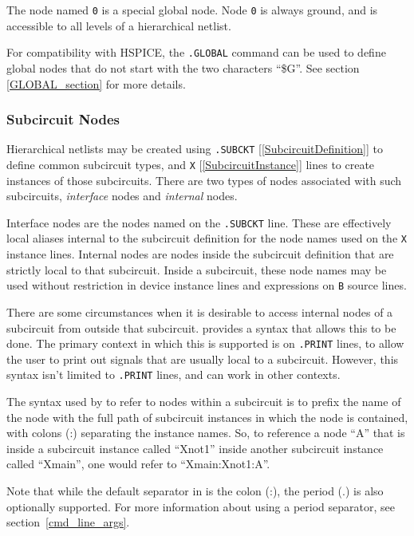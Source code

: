 The node named \texttt{0} is a special global node.  Node \texttt{0}
is always ground, and is accessible to all levels of a hierarchical
netlist.

For compatibility with HSPICE, the \texttt{.GLOBAL} command can
be used to define global nodes that do not start with the two
characters ``\$G''.  See section \ref{GLOBAL_section} for more details.

\subsubsection{Subcircuit Nodes}
\label{subckt_nodes}

Hierarchical netlists may be created using
\texttt{.SUBCKT} [\ref{SubcircuitDefinition}] to define common subcircuit
types, and \texttt{X} [\ref{SubcircuitInstance}] lines to create
instances of those subcircuits.  There are two types of nodes
associated with such subcircuits, {\em interface\/} nodes and {\em
internal\/} nodes.

Interface nodes are the nodes named on the \texttt{.SUBCKT} line.
These are effectively local aliases internal to the subcircuit
definition for the node names used on the \texttt{X} instance lines.
Internal nodes are nodes inside the subcircuit definition that are
strictly local to that subcircuit.  Inside a subcircuit, these node
names may be used without restriction in device instance lines and
expressions on \texttt{B} source lines.

There are some circumstances when it is desirable to access internal
nodes of a subcircuit from outside that subcircuit.  \Xyce{} provides a
syntax that allows this to be done.  The primary context in which this 
is supported is on \texttt{.PRINT} lines, to allow the user to print 
out signals that are usually local to a subcircuit.  However, this 
syntax isn't limited to \texttt{.PRINT} lines, and can work in
other contexts.

The syntax used by \Xyce{} to refer to nodes within a subcircuit is to
prefix the name of the node with the full path of subcircuit instances
in which the node is contained, with colons (:) separating the
instance names.  So, to reference a node ``A'' that is inside a
subcircuit instance called ``Xnot1'' inside another subcircuit
instance called ``Xmain'', one would refer to ``Xmain:Xnot1:A''.

Note that while the default separator in \Xyce{} is the colon (:), the period (.) 
is also optionally supported.  For more information about using a period separator, 
see section~\ref{cmd_line_args}.

